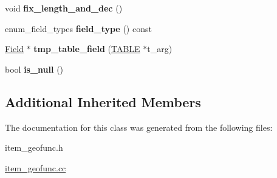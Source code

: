 \begin{DoxyCompactItemize}
\item 
\mbox{\label{classItem__geometry__func_a259af565024257956c839b4d391c37a7}} 
void {\bfseries fix\+\_\+length\+\_\+and\+\_\+dec} ()
\item 
\mbox{\label{classItem__geometry__func_a97f948bb659c04c63d69f767d7145252}} 
enum\+\_\+field\+\_\+types {\bfseries field\+\_\+type} () const
\item 
\mbox{\label{classItem__geometry__func_a6b6f6f7c8c9191bfa6cbdbfdda68f071}} 
\mbox{\hyperlink{classField}{Field}} $\ast$ {\bfseries tmp\+\_\+table\+\_\+field} (\mbox{\hyperlink{structTABLE}{T\+A\+B\+LE}} $\ast$t\+\_\+arg)
\item 
\mbox{\label{classItem__geometry__func_a3f4eb35fa5567f20d15367a094238555}} 
bool {\bfseries is\+\_\+null} ()
\end{DoxyCompactItemize}
\subsection*{Additional Inherited Members}


The documentation for this class was generated from the following files\+:\begin{DoxyCompactItemize}
\item 
item\+\_\+geofunc.\+h\item 
\mbox{\hyperlink{item__geofunc_8cc}{item\+\_\+geofunc.\+cc}}\end{DoxyCompactItemize}
